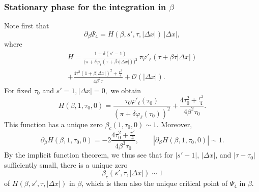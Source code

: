 \documentclass[leqno]{amsart}
\theoremstyle{definition}
\theoremstyle{remark}
\numberwithin{equation}{section}
\newcommand{\scriptO}{\mathcal{O}}
\begin{document}
\subsubsection{Stationary phase for the integration in $\beta$}

Note first that 
\[
\partial_\beta \Psi_4=H(\beta, s',\tau, |\Delta x|)\,|\Delta x|,
\] 
where
\begin{multline*}
H = \frac{ 1+\delta (s'-1)}{\big(\pi + \delta \varphi_\ell(\tau + \beta\tau |\Delta x|)\big)^2}\, \tau
\varphi'_\ell\left(\tau + \beta\tau |\Delta x|\right) \\
+  \frac{4\tau^2(1+\beta |\Delta x|)^2+\tfrac {r^2}4}{4\beta^2\tau}  
+ \scriptO(|\Delta x|).
 \end{multline*}
 For fixed $\tau_0$ and $s'=1,|\Delta x|=0,$ we obtain
\[
H(\beta,1,\tau_0,0)
=\frac{\tau_0\varphi'_\ell(\tau_0)}
{(\pi+\delta\varphi_\ell(\tau_0))^2}
+\frac{4\tau_0^2+\tfrac{r^2}{4}}{4\beta^2\tau_0}.
\]
 This function has a unique zero $\beta_c(1,\tau_0,0)\sim 1.$ Moreover,
\[
\partial_\beta H(\beta,1,\tau_0,0)
=-2\frac{4\tau_0^2+\tfrac{r^2}{4}}
{4\beta^3\tau_0},
\qquad
\left|\partial_\beta H(\beta,1,\tau_0,0)\right|\sim 1.
\]
By the implicit function theorem, we thus see that for $|s'-1|$,
$|\Delta x|$, and $|\tau-\tau_0|$ sufficiently small, there is a
unique zero
\[
\beta_c(s',\tau,|\Delta x|)\sim 1
\]
of $H(\beta,s',\tau,|\Delta x|)$ in $\beta$, which is then also the
unique critical point of $\Psi_4$ in $\beta$.
 
\end{document}
